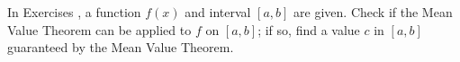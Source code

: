{\noindent In Exercises}
{, a function $f(x)$ and interval $[a,b]$ are given. Check if the Mean Value Theorem can be applied to $f$ on $[a,b]$; if so, find a value $c$ in $[a,b]$ guaranteed by the Mean Value Theorem.}
